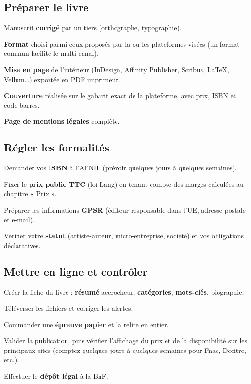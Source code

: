 \subsection{Préparer le livre}

\begin{checklist}
  \item Manuscrit \textbf{corrigé} par un tiers (orthographe, typographie).
  \item \textbf{Format} choisi parmi ceux proposés par la ou les
        plateformes visées (un format commun facilite le multi-canal).
  \item \textbf{Mise en page} de l’intérieur (InDesign, Affinity
        Publisher, Scribus, \LaTeX{}, Vellum…) exportée en PDF imprimeur.
  \item \textbf{Couverture} réalisée sur le gabarit exact de la
        plateforme, avec prix, ISBN et code-barres.
  \item \textbf{Page de mentions légales} complète.
\end{checklist}

\subsection{Régler les formalités}

\begin{checklist}
  \item Demander vos \textbf{ISBN} à l’AFNIL (prévoir quelques jours à
        quelques semaines).
  \item Fixer le \textbf{prix public TTC} (loi Lang) en tenant compte des
        marges calculées au chapitre « Prix ».
  \item Préparer les informations \textbf{GPSR} (éditeur responsable
        dans l’UE, adresse postale et e-mail).
  \item Vérifier votre \textbf{statut} (artiste-auteur, micro-entreprise,
        société) et vos obligations déclaratives.
\end{checklist}

\subsection{Mettre en ligne et contrôler}

\begin{checklist}
  \item Créer la fiche du livre : \textbf{résumé} accrocheur,
        \textbf{catégories}, \textbf{mots-clés}, biographie.
  \item Téléverser les fichiers et corriger les alertes.
  \item Commander une \textbf{épreuve papier} et la relire en entier.
  \item Valider la publication, puis vérifier l’affichage du prix et de
        la disponibilité sur les principaux sites (comptez quelques jours
        à quelques semaines pour Fnac, Decitre, etc.).
  \item Effectuer le \textbf{dépôt légal} à la BnF.
\end{checklist}

